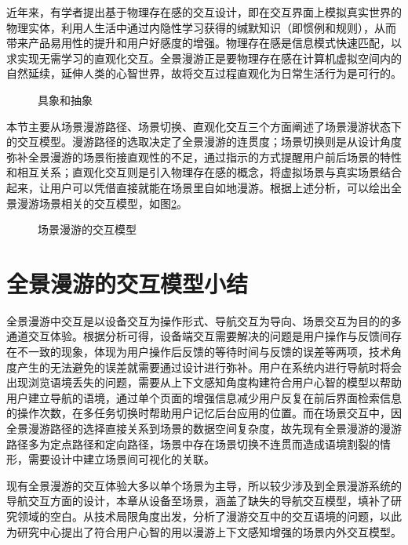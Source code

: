 近年来，有学者提出基于物理存在感的交互设计，即在交互界面上模拟真实世界的物理实体，利用人生活中通过内隐性学习获得的缄默知识（即惯例和规则），从而带来产品易用性的提升和用户好感度的增强。物理存在感是信息模式快速匹配，以求实现无需学习的直观化交互。全景漫游正是要物理存在感在计算机虚拟空间内的自然延续，延伸人类的心智世界，故将交互过程直观化为日常生活行为是可行的。

\begin{figure}[htp]
\centering
{}
\caption{具象和抽象}
\label{fig:wysiwyg}
\end{figure}

本节主要从场景漫游路径、场景切换、直观化交互三个方面阐述了场景漫游状态下的交互模型。漫游路径的选取决定了全景漫游的连贯度；场景切换则是从设计角度弥补全景漫游的场景衔接直观性的不足，通过指示的方式提醒用户前后场景的特性和相互关系；直观化交互则是引入物理存在感的概念，将虚拟场景与真实场景结合起来，让用户可以凭借直接就能在场景里自如地漫游。根据上述分析，可以绘出全景漫游场景相关的交互模型，如图\ref{fig:vr}。

\begin{figure}[htp]
\centering
\fbox{
\texttt{[image: vr]}
}
\caption{场景漫游的交互模型}
\label{fig:vr}
\end{figure}

\section{全景漫游的交互模型小结}
全景漫游中交互是以设备交互为操作形式、导航交互为导向、场景交互为目的的多通道交互体验。根据分析可得，设备端交互需要解决的问题是用户操作与反馈间存在不一致的现象，体现为用户操作后反馈的等待时间与反馈的误差等两项，技术角度产生的无法避免的误差就需要通过设计进行弥补。用户在系统内进行导航时将会出现浏览语境丢失的问题，需要从上下文感知角度构建符合用户心智的模型以帮助用户建立导航的语境，通过单个页面的增强信息减少用户反复在前后界面检索信息的操作次数，在多任务切换时帮助用户记忆后台应用的位置。而在场景交互中，因全景漫游路径的选择直接关系到场景的数据空间复杂度，故先现有全景漫游的漫游路径多为定点路径和定向路径，场景中存在场景切换不连贯而造成语境割裂的情形，需要设计中建立场景间可视化的关联。

现有全景漫游的交互体验大多以单个场景为主导，所以较少涉及到全景漫游系统的导航交互方面的设计，本章从设备至场景，涵盖了缺失的导航交互模型，填补了研究领域的空白。从技术局限角度出发，分析了漫游交互中的交互语境的问题，以此为研究中心提出了符合用户心智的用以漫游上下文感知增强的场景内外交互模型。